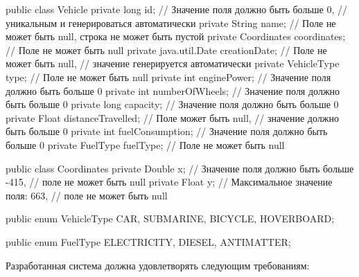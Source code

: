 \documentclass[a4paper,12pt]{article}
\begin{document}
\begin{code}
public class Vehicle {
    private long id; // Значение поля должно быть больше 0,
                     // уникальным и генерироваться автоматически
    private String name; // Поле не может быть null, строка не может быть пустой
    private Coordinates coordinates; // Поле не может быть null
    private java.util.Date creationDate; // Поле не может быть null,
                                         // значение генерируется автоматически
    private VehicleType type; // Поле не может быть null
    private int enginePower; // Значение поля должно быть больше 0
    private int numberOfWheels; // Значение поля должно быть больше 0
    private long capacity; // Значение поля должно быть больше 0
    private Float distanceTravelled; // Поле может быть null,
                                     // значение должно быть больше 0
    private int fuelConsumption; // Значение поля должно быть больше 0
    private FuelType fuelType; // Поле не может быть null
}

public class Coordinates {
    private Double x; // Значение поля должно быть больше -415,
                      // поле не может быть null
    private Float y; // Максимальное значение поля: 663,
                     // поле не может быть null
}

public enum VehicleType {
    CAR,
    SUBMARINE,
    BICYCLE,
    HOVERBOARD;
}

public enum FuelType {
    ELECTRICITY,
    DIESEL,
    ANTIMATTER;
}
\end{code}

Разработанная система должна удовлетворять следующим требованиям:
\end{document}

